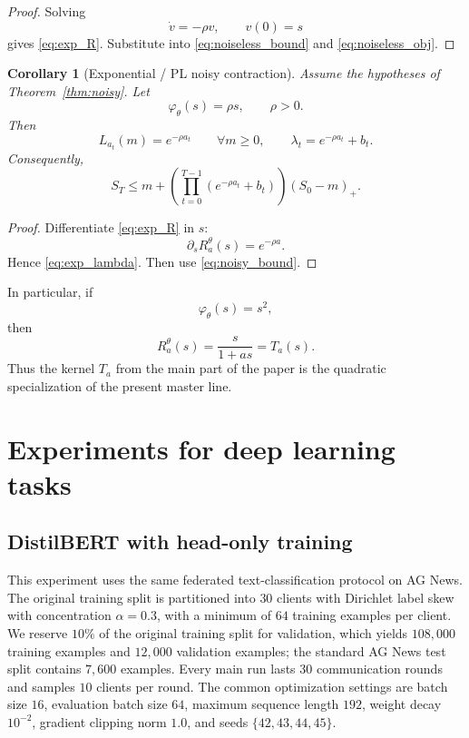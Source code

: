 \documentclass{article}
\newtheorem{corollary}[theorem]{Corollary}
\theoremstyle{definition}
\begin{document}
\begin{proof}
Solving
\[
\dot v=-\rho v,\qquad v(0)=s
\]
gives \eqref{eq:exp_R}. Substitute into \eqref{eq:noiseless_bound} and \eqref{eq:noiseless_obj}.
\end{proof}

\begin{corollary}[Exponential / PL noisy contraction]
\label{cor:exp_noisy}
Assume the hypotheses of Theorem~\ref{thm:noisy}.
Let
\[
\varphi_\theta(s)=\rho s,
\qquad
\rho>0.
\]
Then
\begin{equation}
L_{a_t}(m)=e^{-\rho a_t}
\qquad
\forall m\ge 0,
\qquad
\lambda_t=e^{-\rho a_t}+b_t.
\label{eq:exp_lambda}
\end{equation}
Consequently,
\begin{equation*}
S_T
\le
m+
\left(
\prod_{t=0}^{T-1}(e^{-\rho a_t}+b_t)
\right)
(S_0-m)_+.
\end{equation*}
\end{corollary}

\begin{proof}
Differentiate \eqref{eq:exp_R} in $s$:
\[
\partial_sR_a^\theta(s)=e^{-\rho a}.
\]
Hence \eqref{eq:exp_lambda}. Then use \eqref{eq:noisy_bound}.
\end{proof}

In particular, if
\[
\varphi_\theta(s)=s^2,
\]
then
\[
R_a^\theta(s)=\frac{s}{1+as}=T_a(s).
\]
Thus the kernel $T_a$ from the main part of the paper is the quadratic specialization of the present master line.

\section{Experiments for deep learning tasks}
\label{app:text_experiments}

\subsection{DistilBERT with head-only training}
\label{app:text_distilbert_head_only}

This experiment uses the same federated text-classification protocol on AG News. The original training split is partitioned into \(30\) clients with Dirichlet label skew with concentration \(\alpha=0.3\), with a minimum of \(64\) training examples per client. We reserve \(10\%\) of the original training split for validation, which yields \(108{,}000\) training examples and \(12{,}000\) validation examples; the standard AG News test split contains \(7{,}600\) examples. Every main run lasts \(30\) communication rounds and samples \(10\) clients per round. The common optimization settings are batch size \(16\), evaluation batch size \(64\), maximum sequence length \(192\), weight decay \(10^{-2}\), gradient clipping norm \(1.0\), and seeds \(\{42,43,44,45\}\).
\end{document}
